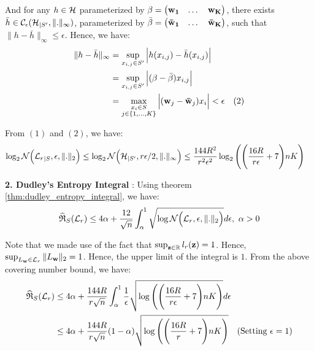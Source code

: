 \noindent And for any $h\in \mathcal{H}$ parameterized by $\beta=\begin{pmatrix} {\bf w_1} &\dots &{\bf w_K}\end{pmatrix}$, there exists $\bar h \in \mathcal{C}_\epsilon(\mathcal{H}_{|S'}, \|.\|_\infty)$, parameterized by $\bar\beta=\begin{pmatrix} {\bf \bar w_1} &\dots &{\bf \bar w_K}\end{pmatrix}$, such that $\|h - \bar h\|_\infty \le \epsilon$. Hence, we have:
\begin{align*}
    \|h - \bar h\|_\infty &= \sup_{x_{i, j} \in S'} \bigAbs{h(x_{i,j}) - \bar h(x_{i,j})} \\
        &= \sup_{x_{i,j}\in S'}\bigAbs{(\beta - \bar\beta)x_{i,j}} \\
        &= \max_{\substack{x_i\in S \\ j\in\{1, \dots, K\}}}\bigAbs{(\vecbf{w}_j - \vecbf{\bar w}_j)x_i} < \epsilon \ \ \ (2)
\end{align*}

\noindent From $(1)$ and $(2)$, we have:
\begin{align*}
    \log_2\mathcal{N}\Big( {\mathcal{L}_r}_{|S}, \epsilon, \|.\|_2 \Big) 
    &\le \log_2\mathcal{N}\Big( \mathcal{H}_{|S'}, r\epsilon/2, \|.\|_\infty \Big)
    \le \frac{144R^2}{r^2\epsilon^2}\log_2\Bigg( 
        \Bigg( 
            \frac{16R}{r\epsilon} + 7
         \Bigg)nK
     \Bigg)
\end{align*}

\noindent\newline\textbf{2. Dudley's Entropy Integral} : Using theorem \ref{thm:dudley_entropy_integral}, we have:
\begin{align*}
    \widehat{\mathfrak{R}}_S(\mathcal{L}_r) \le 4\alpha + \frac{12}{\sqrt n}\int_{\alpha}^1 \sqrt{\log\mathcal{N}\Big( \mathcal{L}_r, \epsilon, \|.\|_2 \Big)}d\epsilon, \ \alpha > 0 
\end{align*}

\noindent Note that we made use of the fact that $\sup_{{\bf z} \in \mathbb{R}} l_r({\bf z}) = 1$. Hence, $\sup_{L_{\bf w}\in\mathcal{L}_r} \|L_{\bf w}\|_2 = 1$. Hence, the upper limit of the integral is $1$. From the above covering number bound, we have:
\begin{align*}
    \widehat{\mathfrak{R}}_S(\mathcal{L}_r) 
        &\le 4\alpha + \frac{144R}{r\sqrt n}\int_{\alpha}^1 \frac{1}{\epsilon}\sqrt{\log\Bigg( 
            \Bigg( \frac{16R}{r\epsilon}+7
         \Bigg)nK \Bigg)}d\epsilon \\
        &\le 4\alpha + \frac{144R}{r\sqrt n} (1-\alpha) \sqrt{
            \log\Bigg( \Bigg( 
                \frac{16R}{r} + 7
             \Bigg)nK \Bigg)
        } \ \ \ \text{(Setting $\epsilon=1$)}
\end{align*}

